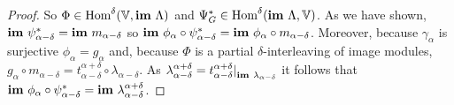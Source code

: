 \begin{proof}

  So $\Phi\in\text{Hom}^\delta(\mathbb{V},\mathbf{im}~\Lambda)$ and $\Psi_G^*\in\text{Hom}^\delta(\mathbf{im}~\Lambda,\mathbb{V})$.
  As we have shown, $\mathbf{im}~\psi_{\alpha-\delta}^* = \mathbf{im}~m_{\alpha-\delta}$ so $\mathbf{im}~\phi_\alpha\circ\psi_{\alpha-\delta}^* = \mathbf{im}~\phi_\alpha\circ m_{\alpha-\delta}$.
  Moreover, because $\gamma_\alpha$ is surjective $\phi_\alpha = g_\alpha$ and, because $\Phi$ is a partial $\delta$-interleaving of image modules, $g_\alpha\circ m_{\alpha-\delta} = t_{\alpha-\delta}^{\alpha+\delta}\circ \lambda_{\alpha-\delta}$.
  As $\lambda_{\alpha-\delta}^{\alpha+\delta} = t_{\alpha-\delta}^{\alpha+\delta}\mathord{\mid}_{\mathbf{im}~\lambda_{\alpha-\delta}}$ it follows that $\mathbf{im}~\phi_\alpha\circ\psi_{\alpha-\delta}^* = \mathbf{im}~\lambda_{\alpha-\delta}^{\alpha+\delta}$.


\end{proof}
